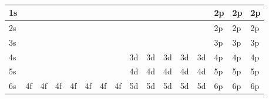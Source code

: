 \onecolumn
\begin{table}
\centering
\caption{}
\label{tab:my-table}
\begin{tabular}{@{}llllllllllllllll@{}}
\toprule
\multicolumn{1}{|l|}{1s} & \multicolumn{1}{l|}{}   & \multicolumn{1}{l|}{}   & \multicolumn{1}{l|}{}   & \multicolumn{1}{l|}{}   & \multicolumn{1}{l|}{}   & \multicolumn{1}{l|}{}   & \multicolumn{1}{l|}{}   & \multicolumn{1}{l|}{}   & \multicolumn{1}{l|}{}   & \multicolumn{1}{l|}{}   & \multicolumn{1}{l|}{}   & \multicolumn{1}{l|}{}   & \multicolumn{1}{l|}{2p} & \multicolumn{1}{l|}{2p} & \multicolumn{1}{l|}{2p} \\ \midrule
\multicolumn{1}{|l|}{2s} & \multicolumn{1}{l|}{}   & \multicolumn{1}{l|}{}   & \multicolumn{1}{l|}{}   & \multicolumn{1}{l|}{}   & \multicolumn{1}{l|}{}   & \multicolumn{1}{l|}{}   & \multicolumn{1}{l|}{}   & \multicolumn{1}{l|}{}   & \multicolumn{1}{l|}{}   & \multicolumn{1}{l|}{}   & \multicolumn{1}{l|}{}   & \multicolumn{1}{l|}{}   & \multicolumn{1}{l|}{2p} & \multicolumn{1}{l|}{2p} & \multicolumn{1}{l|}{2p} \\ \midrule
\multicolumn{1}{|l|}{3s} & \multicolumn{1}{l|}{}   & \multicolumn{1}{l|}{}   & \multicolumn{1}{l|}{}   & \multicolumn{1}{l|}{}   & \multicolumn{1}{l|}{}   & \multicolumn{1}{l|}{}   & \multicolumn{1}{l|}{}   & \multicolumn{1}{l|}{}   & \multicolumn{1}{l|}{}   & \multicolumn{1}{l|}{}   & \multicolumn{1}{l|}{}   & \multicolumn{1}{l|}{}   & \multicolumn{1}{l|}{3p} & \multicolumn{1}{l|}{3p} & \multicolumn{1}{l|}{3p} \\ \midrule
\multicolumn{1}{|l|}{4s} & \multicolumn{1}{l|}{}   & \multicolumn{1}{l|}{}   & \multicolumn{1}{l|}{}   & \multicolumn{1}{l|}{}   & \multicolumn{1}{l|}{}   & \multicolumn{1}{l|}{}   & \multicolumn{1}{l|}{}   & \multicolumn{1}{l|}{3d} & \multicolumn{1}{l|}{3d} & \multicolumn{1}{l|}{3d} & \multicolumn{1}{l|}{3d} & \multicolumn{1}{l|}{3d} & \multicolumn{1}{l|}{4p} & \multicolumn{1}{l|}{4p} & \multicolumn{1}{l|}{4p} \\ \midrule
\multicolumn{1}{|l|}{5s} & \multicolumn{1}{l|}{}   & \multicolumn{1}{l|}{}   & \multicolumn{1}{l|}{}   & \multicolumn{1}{l|}{}   & \multicolumn{1}{l|}{}   & \multicolumn{1}{l|}{}   & \multicolumn{1}{l|}{}   & \multicolumn{1}{l|}{4d} & \multicolumn{1}{l|}{4d} & \multicolumn{1}{l|}{4d} & \multicolumn{1}{l|}{4d} & \multicolumn{1}{l|}{4d} & \multicolumn{1}{l|}{5p} & \multicolumn{1}{l|}{5p} & \multicolumn{1}{l|}{5p} \\ \midrule
\multicolumn{1}{|l|}{6s} & \multicolumn{1}{l|}{4f} & \multicolumn{1}{l|}{4f} & \multicolumn{1}{l|}{4f} & \multicolumn{1}{l|}{4f} & \multicolumn{1}{l|}{4f} & \multicolumn{1}{l|}{4f} & \multicolumn{1}{l|}{4f} & \multicolumn{1}{l|}{5d} & \multicolumn{1}{l|}{5d} & \multicolumn{1}{l|}{5d} & \multicolumn{1}{l|}{5d} & \multicolumn{1}{l|}{5d} & \multicolumn{1}{l|}{6p} & \multicolumn{1}{l|}{6p} & \multicolumn{1}{l|}{6p} \\ \midrule

\end{tabular}
\end{table}

